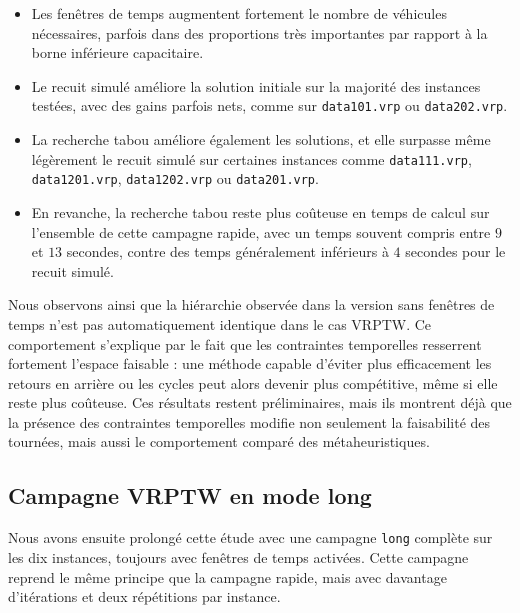 \documentclass[11pt,a4paper]{article}
\begin{document}
\begin{itemize}
    \item Les fenêtres de temps augmentent fortement le nombre de véhicules nécessaires, parfois dans des proportions très importantes par rapport à la borne inférieure capacitaire.
    \item Le recuit simulé améliore la solution initiale sur la majorité des instances testées, avec des gains parfois nets, comme sur \texttt{data101.vrp} ou \texttt{data202.vrp}.
    \item La recherche tabou améliore également les solutions, et elle surpasse même légèrement le recuit simulé sur certaines instances comme \texttt{data111.vrp}, \texttt{data1201.vrp}, \texttt{data1202.vrp} ou \texttt{data201.vrp}.
    \item En revanche, la recherche tabou reste plus coûteuse en temps de calcul sur l'ensemble de cette campagne rapide, avec un temps souvent compris entre \(9\) et \(13\) secondes, contre des temps généralement inférieurs à \(4\) secondes pour le recuit simulé.
\end{itemize}

Nous observons ainsi que la hiérarchie observée dans la version sans fenêtres de temps n'est pas automatiquement identique dans le cas VRPTW. Ce comportement s'explique par le fait que les contraintes temporelles resserrent fortement l'espace faisable : une méthode capable d'éviter plus efficacement les retours en arrière ou les cycles peut alors devenir plus compétitive, même si elle reste plus coûteuse. Ces résultats restent préliminaires, mais ils montrent déjà que la présence des contraintes temporelles modifie non seulement la faisabilité des tournées, mais aussi le comportement comparé des métaheuristiques.

\subsection{Campagne VRPTW en mode long}
Nous avons ensuite prolongé cette étude avec une campagne \texttt{long} complète sur les dix instances, toujours avec fenêtres de temps activées. Cette campagne reprend le même principe que la campagne rapide, mais avec davantage d'itérations et deux répétitions par instance.
\end{document}
